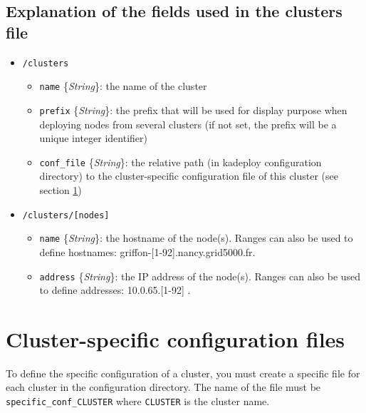 \documentclass[a4wide,10pt,oneside]{book}
\newcommand{\ypath}[1]{\texttt{#1}}
\newcommand{\yfield}[2]{\texttt{#1} {\small\{{\emph{#2}}\}}:}
\begin{document}
\subsection{Explanation of the fields used in the clusters file\\}
\begin{itemize}
  \item \ypath{/clusters}
  \begin{itemize}
    \item \yfield{name}{String} the name of the cluster
    \item \yfield{prefix}{String} the prefix that will be used for display purpose when deploying nodes from several clusters (if not set, the prefix will be a unique integer identifier)
    \item \yfield{conf\_file}{String} the relative path (in kadeploy configuration directory) to the cluster-specific configuration file of this cluster (see section \ref{sec:specific_config})
  \end{itemize}

  \item \ypath{/clusters/[nodes]}
  \begin{itemize}
    \item \yfield{name}{String} the hostname of the node(s). Ranges can also be used to define hostnames: griffon-[1-92].nancy.grid5000.fr.
    \item \yfield{address}{String} the IP address of the node(s). Ranges can also be used to define addresses: 10.0.65.[1-92] .
  \end{itemize}
\end{itemize}

\section{Cluster-specific configuration files}\label{sec:specific_config}
To define the specific configuration of a cluster, you must create a specific file for each cluster in the configuration directory. The name of the file must be \texttt{specific\_conf\_CLUSTER} where \texttt{CLUSTER} is the cluster name.
\end{document}
